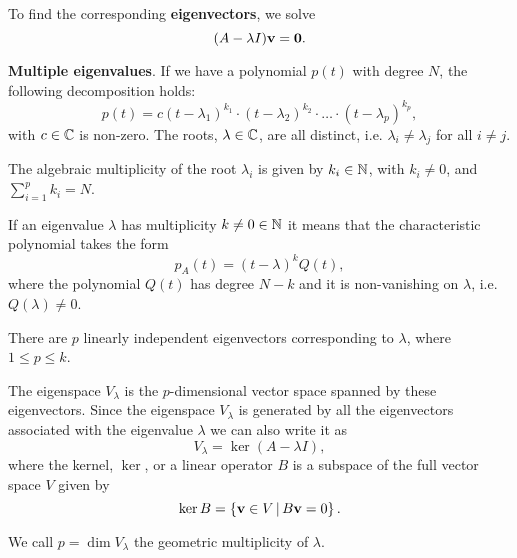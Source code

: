 \documentclass[10pt, a4paper]{article}
\begin{document}
To find the corresponding \textbf{eigenvectors},
we solve
\[
(A - \lambda I)\mathbf{v} = \mathbf{0}.
\]

\textbf{Multiple eigenvalues}.
If we have a polynomial $p(t)$ with degree $N$,
the following decomposition holds:
\[
p(t) = c(t - \lambda_1) ^ {k_1} \cdot (t - \lambda_2) ^ {k_2} \cdot \dotsc \cdot (t - \lambda_p) ^ {k_p},
\]
with $c \in \mathbb{C}$ is non-zero.
The roots,
$\lambda \in \mathbb{C}$,
are all distinct,
i.e. $\lambda_i \neq \lambda_j$ for all $i \neq j$.

\begin{definition}
    The algebraic multiplicity of the root $\lambda_i$ is given by $k_i \in \mathbb{N}$,
    with $k_i \neq 0$,
    and $\sum_{i = 1}^{p}k_i = N$.
\end{definition}

\begin{remark}
    If an eigenvalue $\lambda$ has multiplicity $k \neq 0 \in \mathbb{N}$ it means that the characteristic polynomial takes the form
    \[
    p_A(t) = (t - \lambda) ^ kQ(t),
    \]
    where the polynomial $Q(t)$ has degree $N - k$ and it is non-vanishing on $\lambda$,
    i.e. $Q(\lambda) \neq 0$.
\end{remark}

\begin{proposition}
    There are $p$ linearly independent eigenvectors corresponding to $\lambda$,
    where $1 \leq p \leq k$.
\end{proposition}

\begin{definition}
    The eigenspace $V_{\lambda}$ is the $p$-dimensional vector space spanned by these eigenvectors.
    Since the eigenspace $V_{\lambda}$ is generated by all the eigenvectors associated with the eigenvalue $\lambda$ we can also write it as
    \[
    V_{\lambda} = \ker(A - \lambda I),
    \]
    where the kernel,
    $\ker$,
    or a linear operator $B$ is a subspace of the full vector space $V$ given by
    \[
    \ker{B} = \left\{\mathbf{v} \in V\,\middle|\, B\mathbf{v} = 0\right\}.
    \]
\end{definition}

\begin{definition}
    We call $p = \dim{V_{\lambda}}$ the geometric multiplicity of $\lambda$.
\end{definition}
\end{document}
